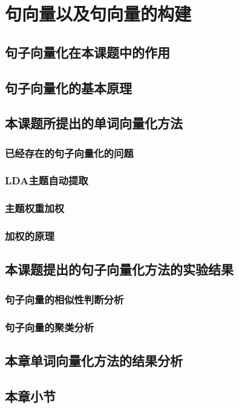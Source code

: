 \chapter{句向量以及句向量的构建}


\section{句子向量化在本课题中的作用}

\section{句子向量化的基本原理}

\section{本课题所提出的单词向量化方法}

\subsection{已经存在的句子向量化的问题}
\subsection{LDA主题自动提取}
\subsection{主题权重加权}
\subsection{加权的原理}


\section{本课题提出的句子向量化方法的实验结果}

\subsection{句子向量的相似性判断分析}
\subsection{句子向量的聚类分析}

\section{本章单词向量化方法的结果分析}

\section{本章小节}

